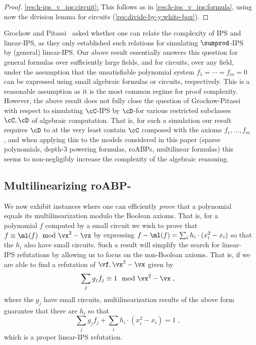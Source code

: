 \documentclass{toc}
\begin{document}
\begin{proof}
        \uline{\eqref{res:h-ips_v_ips:circuit}:} This follows as in \eqref{res:h-ips_v_ips:formula}, using now the division lemma for circuits (\autoref{res:divide-by-y:white-box}).
\end{proof}

Grochow and Pitassi~\cite[Open Question 1.13\footnote{This refers to the following version: \url{http://arxiv.org/abs/1404.3820v1}\!\!\!.}]{DBLP:journals/jacm/GrochowP18} asked whether one can relate the complexity of IPS and linear-IPS, as they only established such relations for simulating $\sumprod$-IPS by (general) linear-IPS\@.  Our above result essentially answers this question for general formulas over sufficiently large fields, and for circuits, over any field, under the assumption that the unsatisfiable polynomial system $f_1=\cdots=f_m=0$ can be expressed using small algebraic formulas or circuits, respectively.  This is a reasonable assumption as it is the most common regime for proof complexity.  However, the above result does not fully close the question of Grochow-Pitassi~\cite{DBLP:journals/jacm/GrochowP18} with respect to simulating $\cC$-IPS by $\cD$-\lIPS for various restricted subclasses $\cC,\cD$ of algebraic computation.  That is, for such a simulation our result requires $\cD$ to at the very least contain $\cC$ composed with the axioms $f_1,\ldots,f_m$, and  when applying this to the models considered in this paper (sparse polynomials, depth-3 powering formulas, roABPs, multilinear formulas) this seems to non-negligibly increase the complexity of the algebraic reasoning.

\subsection{Multilinearizing roABP-\lIPS}\label{sec:multilinearization:roABP}

We now exhibit instances where one can efficiently \emph{prove} that a polynomial equals its multilinearization modulo the Boolean axioms. That is, for a polynomial $f$ computed by a small circuit we wish to prove that $f\equiv \ml(f)\mod \vx^2-\vx$ by expressing $f-\ml(f)=\sum_i h_i \cdot (x_i^2-x_i)$ so that the $h_i$ also have small circuits.  Such a result will simplify the search for linear-IPS refutations by allowing us to focus on the non-Boolean axioms.  That is, if we are able to find a refutation of $\vf,\vx^2-\vx$ given by
\[
        \sum_j g_j f_j \equiv 1 \mod \vx^2-\vx
        \;,
\]
where the $g_j$ have small circuits, multilinearization results of the above form guarantee that there are $h_i$ so that
\[
        \sum_j g_j f_j +\sum_i h_i\cdot (x_i^2-x_i)=1
        \;,
\]
which is a proper linear-IPS refutation.
\end{document}
